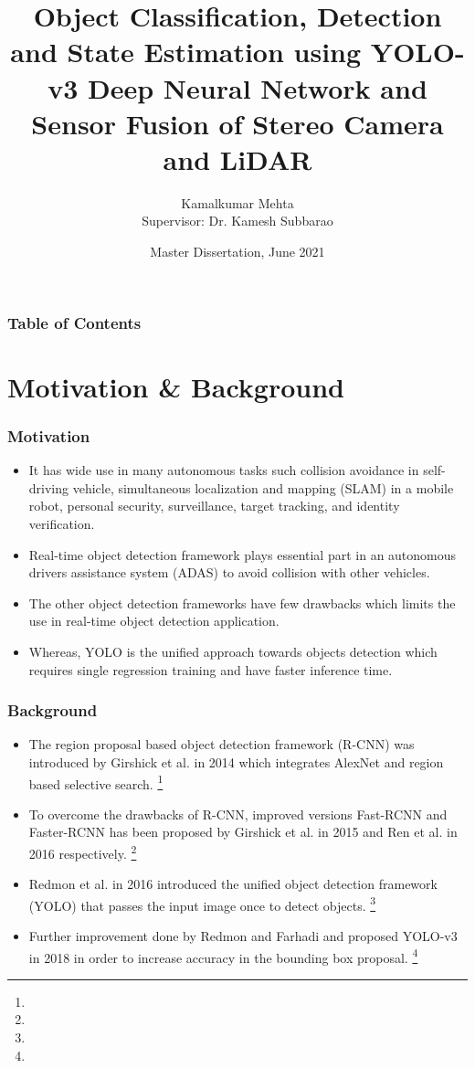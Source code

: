 \documentclass[10pt]{beamer}
\title[Object States Estimation] %
{Object Classification, Detection and State Estimation using YOLO-v3 Deep Neural
Network and Sensor Fusion of Stereo Camera and LiDAR}
\author[K. Mehta] %
{Kamalkumar Mehta\\
 Supervisor: Dr. Kamesh Subbarao}
\institute[UTA] %
{
  Aerospace System Laboratory\\
  Department of Mechanical and Aerospace Engineering\\
  The University of Texas at Arlington
}
\date %
{Master Dissertation, June 2021}
\begin{document}
\frame{\titlepage}

\begin{frame}
\frametitle{Table of Contents}
\tableofcontents
\end{frame}



\section{Motivation \& Background}

\begin{frame}
\frametitle{Motivation}
\begin{itemize}
    \item It has wide use in many autonomous tasks such collision avoidance in self-driving vehicle, simultaneous localization and mapping (SLAM) in a mobile robot, personal security, surveillance, target tracking, and identity verification.   
    \item Real-time object detection framework plays essential part in an autonomous drivers assistance system (ADAS) to avoid collision with other vehicles. 
    \item The other object detection frameworks have few drawbacks which limits the use in real-time object detection application.  
    \item Whereas, YOLO is the unified approach towards objects detection which requires \alert{single regression training} and have \alert{faster inference time}.   
\end{itemize}
\end{frame}

\begin{frame}
\frametitle{Background}
\begin{itemize}
    \item The region proposal based object detection framework (R-CNN) was introduced by Girshick et al. in 2014 which integrates AlexNet and region based selective search. \footnote[frame]{}
    \item To overcome the drawbacks of R-CNN, improved versions Fast-RCNN and Faster-RCNN has been proposed by Girshick et al. in 2015 and Ren et al. in 2016 respectively. \footnote[frame]{}
    \item Redmon et al. in 2016 introduced the unified object detection framework (YOLO) that passes the input image once to detect objects. \footnote[frame]{}
    \item Further improvement done by Redmon and Farhadi and proposed YOLO-v3 in 2018 in order to increase accuracy in the bounding box proposal. \footnote[frame]{}   
\end{itemize}

\end{frame}
\end{document}
